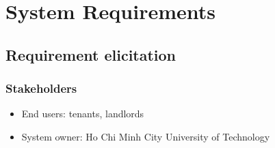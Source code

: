 \chapter{System Requirements}
\section{Requirement elicitation}
\subsection{Stakeholders}
\begin{itemize}
    \item End users: tenants, landlords
    \item System owner: Ho Chi Minh City University of Technology
\end{itemize}
